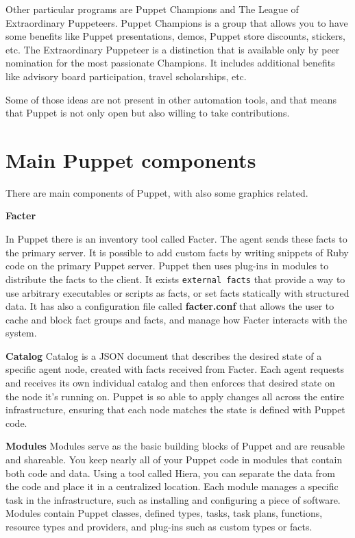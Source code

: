 \documentclass[12pt,a4paper,openright,twoside]{book}
\begin{document}
Other particular programs are Puppet Champions and The League of Extraordinary Puppeteers.
Puppet Champions is a group that allows you to have some benefits like Puppet presentations, demos, Puppet store discounts, stickers, etc.
The Extraordinary Puppeteer is a distinction that is available only by peer nomination for the most passionate Champions. It includes additional benefits like advisory board participation, travel scholarships, etc.


Some of those ideas are not present in other automation tools, and that means that Puppet is not only open but also willing to take contributions.

\section{Main Puppet components}

There are main components of Puppet, with also some graphics related.

\textbf{Facter}

In Puppet there is an inventory tool called Facter. The agent sends these facts to the primary server.
It is possible to add custom facts by writing snippets of Ruby code on the primary Puppet server. Puppet then uses plug-ins in modules to distribute the facts to the client.
It exists \texttt{external facts} that provide a way to use arbitrary executables or scripts as facts, or set facts statically with structured data.
It has also a configuration file called \textbf{facter.conf} that allows the user to cache and block fact groups and facts, and manage how Facter interacts with the system.

\cite{puppetDocPlatform} \cite{puppetDocFacter}

\textbf{Catalog}
Catalog is a JSON document that describes the desired state of a specific agent node, created with facts received from Facter.
Each agent requests and receives its own individual catalog and then enforces that desired state on the node it's running on.
Puppet is so able to apply changes all across the entire infrastructure, ensuring that each node matches the state is defined with Puppet code. \cite{puppetDocPlatform}

\textbf{Modules}
Modules serve as the basic building blocks of Puppet and are reusable and shareable.
You keep nearly all of your Puppet code in modules that contain both code and data.
Using a tool called Hiera, you can separate the data from the code and place it in a centralized location.
Each module manages a specific task in the infrastructure, such as installing and configuring a piece of software.
Modules contain Puppet classes, defined types, tasks, task plans, functions, resource types and providers, and plug-ins such as custom types or facts. 
\cite{puppetDocPlatform} \cite{puppetDocModules}
\end{document}

